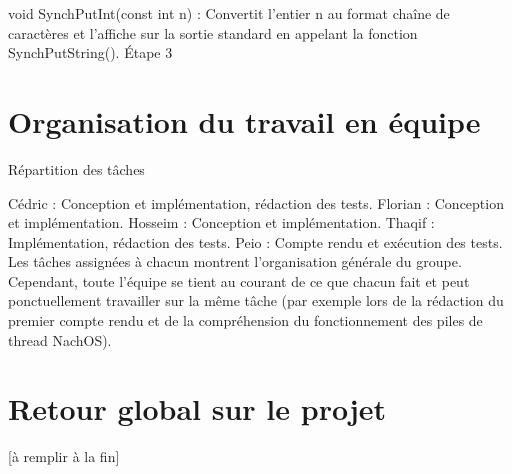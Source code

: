\documentclass{book}
\begin{document}
void SynchPutInt(const int n) : 
Convertit l'entier n au format chaîne de caractères et l'affiche sur la sortie standard en appelant la fonction SynchPutString().
Étape 3

\part{Organisation du travail en équipe}
Répartition des tâches

Cédric : Conception et implémentation, rédaction des tests.
Florian : Conception et implémentation.
Hosseim : Conception et implémentation.
Thaqif : Implémentation, rédaction des tests.
Peio : Compte rendu et exécution des tests.
Les tâches assignées à chacun montrent l’organisation générale du groupe. Cependant, toute l’équipe se tient au courant de ce que chacun fait et peut ponctuellement travailler sur la même tâche (par exemple lors de la rédaction du premier compte rendu et de la compréhension du fonctionnement des piles de thread NachOS).


\part{Retour global sur le projet}

[à remplir à la fin]
\end{document}
